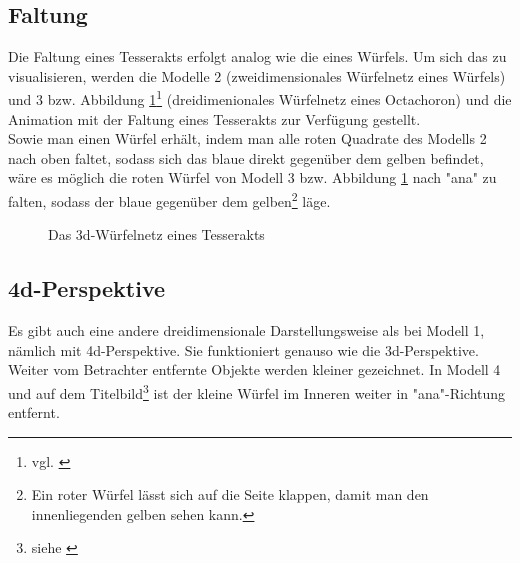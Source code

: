 	\subsection*{Faltung}
		 Die Faltung eines Tesserakts erfolgt analog wie die eines Würfels. Um sich das zu visualisieren, werden die Modelle 2 (zweidimensionales Würfelnetz eines Würfels) und 3 bzw. Abbildung \ref{Tesserakt}\footnote{vgl. \cite{Wuerfelnetz}} (dreidimenionales Würfelnetz eines Octachoron) und die Animation mit der Faltung eines Tesserakts zur Verfügung gestellt.
		 \\ \indent Sowie man einen Würfel erhält, indem man alle roten Quadrate des Modells 2 nach oben faltet, sodass sich das blaue direkt gegenüber dem gelben befindet, wäre es möglich die roten Würfel von Modell 3 bzw. Abbildung \ref{Tesserakt} nach "ana" zu falten, sodass der blaue gegenüber dem gelben\footnote{Ein roter Würfel lässt sich auf die Seite klappen, damit man den innenliegenden gelben sehen kann.} läge. 

\begin{figure}[h]
\centering

\caption[lala]{Das 3d-Würfelnetz eines Tesserakts}
\label{Tesserakt}
\end{figure} 
		 
	\subsection*{4d-Perspektive}
Es gibt auch eine andere dreidimensionale Darstellungsweise als bei Modell 1, nämlich mit 4d-Perspektive. Sie funktioniert genauso wie die 3d-Perspektive. Weiter vom Betrachter entfernte Objekte werden kleiner gezeichnet. In Modell 4 und auf dem Titelbild\footnote{siehe \cite{Titelbild}} ist der kleine Würfel im Inneren weiter in "ana"-Richtung entfernt. 


